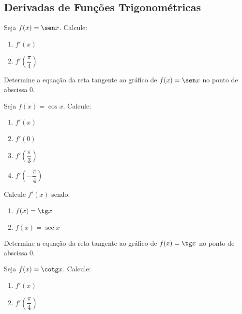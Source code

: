 \subsection{Derivadas de Funções Trigonométricas}

\begin{exercicio}[1]
\label{ex:7.5.1}
Seja $f(x) = \sen x$. Calcule:
\begin{enumerate}[label=\alph*)]
    \item $f'(x)$
    \item $f'\!\left(\dfrac{\pi}{4}\right)$
\end{enumerate}
\end{exercicio}

\begin{exercicio}[2]
\label{ex:7.5.2}
Determine a equação da reta tangente ao gráfico de $f(x) = \sen x$ no ponto de abscissa 0.
\end{exercicio}

\begin{exercicio}[3]
\label{ex:7.5.3}
Seja $f(x) = \cos x$. Calcule:
\begin{enumerate}[label=\alph*)]
    \item $f'(x)$
    \item $f'(0)$
    \item $f'\!\left(\dfrac{\pi}{3}\right)$
    \item $f'\!\left(-\dfrac{\pi}{4}\right)$
\end{enumerate}
\end{exercicio}

\begin{exercicio}[4]
\label{ex:7.5.4}
Calcule $f'(x)$ sendo:
\begin{enumerate}[label=\alph*)]
    \item $f(x) = \tg x$
    \item $f(x) = \sec x$
\end{enumerate}
\end{exercicio}

\begin{exercicio}[5]
\label{ex:7.5.5}
Determine a equação da reta tangente ao gráfico de $f(x) = \tg x$ no ponto de abscissa 0.
\end{exercicio}

\begin{exercicio}[6]
\label{ex:7.5.6}
Seja $f(x) = \cotg x$. Calcule:
\begin{enumerate}[label=\alph*)]
    \item $f'(x)$
    \item $f'\!\left(\dfrac{\pi}{4}\right)$
\end{enumerate}
\end{exercicio}

